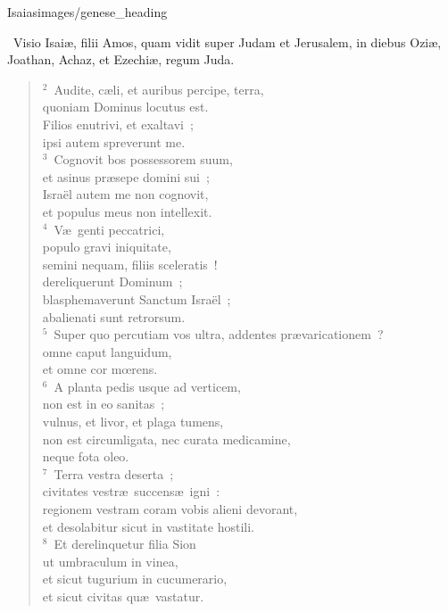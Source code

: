 {Isaias}{images/genese_heading}

~\lettrine[lines=10,image=true,loversize=0.05,lraise=-0.03]{V}{}isio Isai\ae , filii Amos, quam vidit super Judam et Jerusalem, in diebus Ozi\ae , Joathan, Achaz, et Ezechi\ae , regum Juda.


\begin{flushleft}\begin{verse}\vspace{6pt}${}^{2}$~Audite, c\ae li, et auribus percipe, terra,\\ quoniam Dominus locutus est.\\ Filios enutrivi, et exaltavi~;\\ ipsi autem spreverunt me.\\
${}^{3}$~Cognovit bos possessorem suum,\\ et asinus pr\ae sepe domini sui~;\\ Isra\"el autem me non cognovit,\\ et populus meus non intellexit.\\
${}^{4}$~V\ae\ genti peccatrici,\\ populo gravi iniquitate,\\ semini nequam, filiis sceleratis~!\\ dereliquerunt Dominum~;\\ blasphemaverunt Sanctum Isra\"el~;\\ abalienati sunt retrorsum.\\
${}^{5}$~Super quo percutiam vos ultra, addentes pr\ae varicationem~?\\ omne caput languidum,\\ et omne cor mœrens.\\
${}^{6}$~A planta pedis usque ad verticem,\\ non est in eo sanitas~;\\ vulnus, et livor, et plaga tumens,\\ non est circumligata, nec curata medicamine,\\ neque fota oleo.\\
${}^{7}$~Terra vestra deserta~;\\ civitates vestr\ae\ succens\ae\ igni~:\\ regionem vestram coram vobis alieni devorant,\\ et desolabitur sicut in vastitate hostili.\\
${}^{8}$~Et derelinquetur filia Sion\\ ut umbraculum in vinea,\\ et sicut tugurium in cucumerario,\\ et sicut civitas qu\ae\ vastatur.\\

\end{verse}
\end{flushleft}
